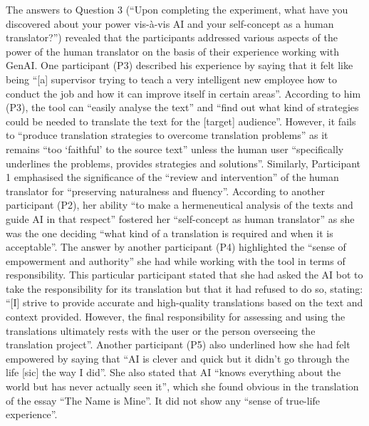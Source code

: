 \documentclass[output=paper,colorlinks,citecolor=brown]{langscibook}
\begin{document}
The answers to Question 3 (“Upon completing the experiment, what have you discovered about your power vis-à-vis AI and your self-concept as a human translator?”) revealed that the participants addressed various aspects of the power of the human translator on the basis of their experience working with GenAI. One participant (P3) described his experience by saying that it felt like being “[a] supervisor trying to teach a very intelligent new employee how to conduct the job and how it can improve itself in certain areas”. According to him (P3), the tool can “easily analyse the text” and “find out what kind of strategies could be needed to translate the text for the [target] audience”. However, it fails to “produce translation strategies to overcome translation problems” as it remains “too ‘faithful’ to the source text” unless the human user “specifically underlines the problems, provides strategies and solutions”. Similarly, Participant 1 emphasised the significance of the “review and intervention” of the human translator for “preserving naturalness and fluency”. According to another participant (P2), her ability “to make a hermeneutical analysis of the texts and guide AI in that respect” fostered her “self-concept as human translator” as she was the one deciding “what kind of a translation is required and when it is acceptable”. The answer by another participant (P4) highlighted the “sense of empowerment and authority” she had while working with the tool in terms of responsibility. This particular participant stated that she had asked the AI bot to take the responsibility for its translation but that it had refused to do so, stating: “[I] strive to provide accurate and high-quality translations based on the text and context provided. However, the final responsibility for assessing and using the translations ultimately rests with the user or the person overseeing the translation project”. Another participant (P5) also underlined how she had felt empowered by saying that “AI is clever and quick but it didn’t go through the life [sic] the way I did”. She also stated that AI “knows everything about the world but has never actually seen it”, which she found obvious in the translation of the essay “The Name is Mine”. It did not show any “sense of true-life experience”.
\end{document}
